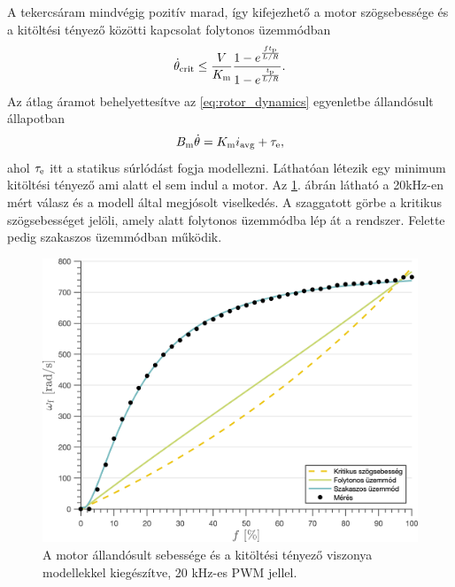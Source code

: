A tekercsáram mindvégig pozitív marad, így kifejezhető a motor szögsebessége és a kitöltési tényező közötti 
kapcsolat folytonos üzemmódban 
\begin{equation}
    \dot\theta_{\mathrm{crit}} \le \frac{V}{K_{\mathrm{m}}}\frac{1-e^{\frac{ft_{\mathrm{p}}}{L/R}}}{1-e^{\frac{t_{\mathrm{p}}}{L/R}}}.
\end{equation}
Az átlag áramot behelyettesítve az \eqref{eq:rotor_dynamics} egyenletbe állandósult állapotban 
\begin{equation}
    B_{\mathrm{m}}\dot\theta = K_{\mathrm{m}} i_{\mathrm{avg}} + \tau_{\mathrm{e}},
\end{equation}
ahol \(\tau_{\mathrm{e}}\) itt a statikus súrlódást fogja modellezni. Láthatóan létezik egy minimum kitöltési tényező 
ami alatt el sem indul a motor. 
Az \ref{fig:motor_response_20khz_with_model}. ábrán látható a 20kHz-en mért válasz és a modell által megjósolt viselkedés. 
A szaggatott görbe a kritikus szögsebességet jelöli, amely alatt folytonos üzemmódba lép át a rendszer. Felette pedig szakaszos üzemmódban működik. 

\begin{figure}[t!]
    \begin{center}
    \includegraphics[width=\textwidth]{images/motor_pwm_response20_with_model.png}
    \caption{A motor állandósult sebessége és a kitöltési tényező viszonya modellekkel kiegészítve, 20 kHz-es PWM jellel.}\label{fig:motor_response_20khz_with_model}
    \end{center}
\end{figure}

